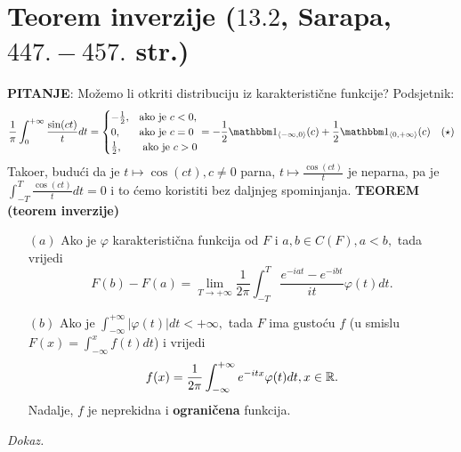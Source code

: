 \documentclass{article}
\begin{document}
\section{Teorem inverzije (\textsection \(13.2\), Sarapa, \(447.-457.\) str.)}
\textbf{PITANJE}: Možemo li otkriti distribuciju iz karakteristične funkcije?\newline\newline 
Podsjetnik:\[\frac1\pi\int_0^{+\infty}\frac{\sin(ct)}tdt=\begin{cases}-\frac12,&\text{ako je }c<0,\\0,&\text{ako je }c=0\\\frac12,&\text{ ako je }c>0\end{cases}=-\frac12\mathbbm 1_{\langle-\infty,0\rangle}(c)+\frac12\mathbbm 1_{\langle0,+\infty\rangle}(c)\quad(\star)\] Tako\dj{}er, budući da je \(t\mapsto \cos(ct),c\ne0\) parna, \(t\mapsto\frac{\cos(ct)}t\) je neparna, pa je \(\int_{-T}^T\frac{\cos(ct)}tdt=0\) i to ćemo koristiti bez daljnjeg spominjanja.\newline
\textbf{TEOREM (teorem inverzije)}
\begin{enumerate}
    \item[\((a)\)] Ako je \(\varphi\) karakteristična funkcija od \(F\) i \(a,b\in C(F),a<b,\) tada vrijedi \[F(b)-F(a)=\lim_{T\to+\infty}\frac1{2\pi}\int_{-T}^T\frac{e^{-iat}-e^{-ibt}}{it}\varphi(t)dt.\]
    \item[\((b)\)] Ako je \(\displaystyle\int_{-\infty}^{+\infty}|\varphi(t)|dt<+\infty,\) tada \(F\) ima gustoću \(f\) (u smislu \(F(x)=\int_{-\infty}^xf(t)dt\)) i vrijedi \[f(x)=\frac1{2\pi}\int_{-\infty}^{+\infty}e^{-itx}\varphi(t)dt,x\in\Bbb R.\] Nadalje, \(f\) je neprekidna i \textbf{ograničena} funkcija. 
\end{enumerate}
\textit{Dokaz.}
\end{document}
